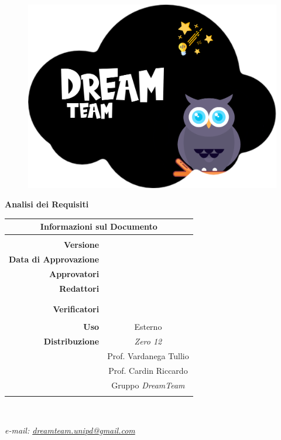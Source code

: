 
\begin{center}
\begin{figure}
\centering
\includegraphics[scale=0.05]{Sezioni/images/DreamTeam.png} 
\end{figure}

{\Huge{\textbf{Analisi dei Requisiti}}} \\ [1cm]

\begin{table}[htbp]
\centering
\begin{tabular}{r|c}
\multicolumn{2}{c}{\textbf{Informazioni sul Documento}} \\
\hline \\
\textbf{Versione} &  \\ \rule{0pt}{3ex}   
\textbf{Data di Approvazione} &  \\ \rule{0pt}{3ex}    
\textbf{Approvatori} &  \\ \rule{0pt}{3ex}      
\textbf{Redattori} & \FP{} \\ \rule{0pt}{2ex}   
& \GC{} \\ \rule{0pt}{2ex}    
& \LW{} \\ \rule{0pt}{3ex}    
\textbf{Verificatori} & \PV{} \\ \rule{0pt}{2ex}     
& \MG{} \\ \rule{0pt}{3ex}      
\textbf{Uso} & Esterno \\ \rule{0pt}{3ex}    
\textbf{Distribuzione} & \textit{Zero 12} \\ \rule{0pt}{2ex} 
& Prof. Vardanega Tullio \\ \rule{0pt}{2ex}   
& Prof. Cardin Riccardo \\ \rule{0pt}{2ex}   
& Gruppo \textit{DreamTeam} \\ \rule{0pt}{0.1cm}   
\end{tabular} \\ [0.5cm]
\end{table}

\textsl{ e-mail: \href{mailto:dreamteam.unipd@gmail.com}{dreamteam.unipd@gmail.com} } \\[2cm]
\end{center}
\pagebreak